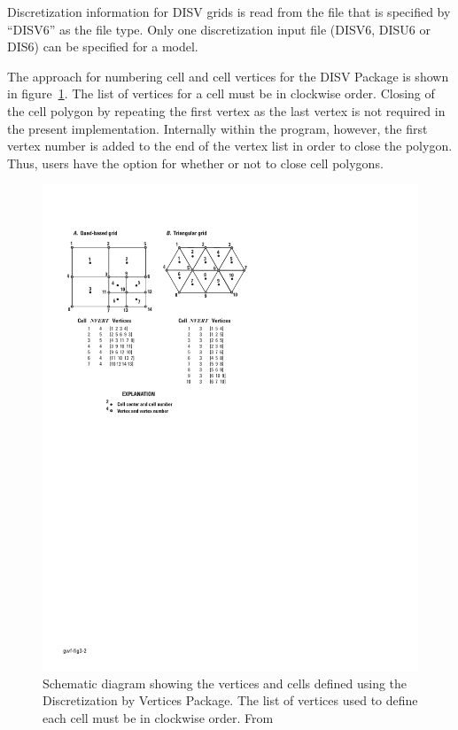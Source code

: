 Discretization information for DISV grids is read from the file that is specified by ``DISV6'' as the file type.  Only one discretization input file (DISV6, DISU6 or DIS6) can be specified for a model.

The approach for numbering cell and cell vertices for the DISV Package is shown in figure~\ref{fig:gwf-fig3-2}.  The list of vertices for a cell must be in clockwise order.  Closing of the cell polygon by repeating the first vertex as the last vertex is not required in the present implementation.  Internally within the program, however, the first vertex number is added to the end of the vertex list in order to close the polygon.  Thus, users have the option for whether or not to close cell polygons.

\begin{figure}[ht]
	\centering
	\includegraphics[scale=1.0]{Figures/gwf-fig3-2}
	\caption{Schematic diagram showing the vertices and cells defined using the Discretization by Vertices Package. The list of vertices used to define each cell must be in clockwise order.  From \cite{modflow6gwf}}
	\label{fig:gwf-fig3-2}
\end{figure}


